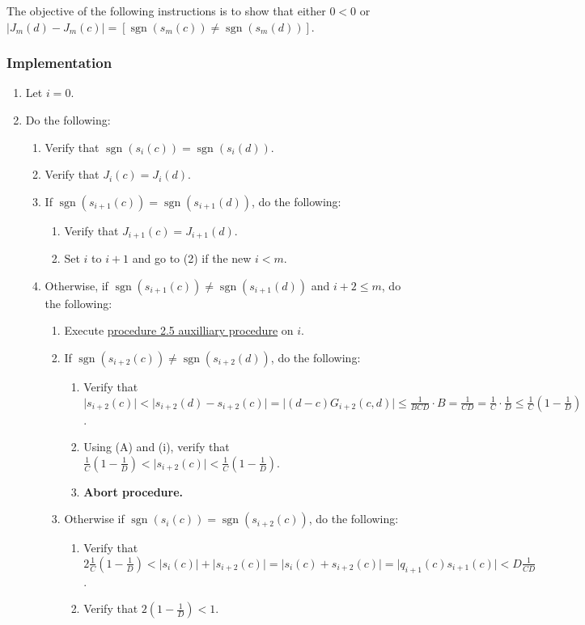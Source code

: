 \documentclass[twocolumn]{article}
\DeclareMathOperator{\sgn}{sgn}
\newcommand{\implementation}{\subsubsection*{Implementation}}
\begin{document}
				The objective of the following instructions is to show that either $0<0$ or $\lvert J_m(d)-J_m(c)\rvert=[\sgn(s_m(c))\ne\sgn(s_m(d))]$.
			\implementation
				\begin{enumerate}
					\item Let $i=0$.
					\item Do the following:
					\begin{enumerate}
						\item Verify that $\sgn(s_i(c))=\sgn(s_i(d))$.
						\item Verify that $J_i(c)=J_i(d)$.
						\item If $\sgn(s_{i+1}(c))=\sgn(s_{i+1}(d))$, do the following:
						\begin{enumerate}
							\item Verify that $J_{i+1}(c)=J_{i+1}(d)$.
							\item Set $i$ to $i+1$ and go to (2) if the new $i<m$.
						\end{enumerate}
						\item Otherwise, if $\sgn(s_{i+1}(c))\ne\sgn(s_{i+1}(d))$ and $i+2\le m$, do the following:
						\begin{enumerate}
							\item Execute \hyperref[sec:procedure 2.5 auxilliary procedure]{procedure 2.5 auxilliary procedure} on $i$.
							\item If $\sgn(s_{i+2}(c))\ne\sgn(s_{i+2}(d))$, do the following:
							\begin{enumerate}
								\item Verify that $\lvert s_{i+2}(c)\rvert<\lvert s_{i+2}(d)-s_{i+2}(c)\rvert=\lvert (d-c)G_{i+2}(c,d)\rvert\le\frac{1}{BCD}\cdot B=\frac{1}{CD}=\frac{1}{C}\cdot\frac{1}{D}\le\frac{1}{C}(1-\frac{1}{D})$.
								\item Using (A) and (i), verify that $\frac{1}{C}(1-\frac{1}{D})<\lvert s_{i+2}(c)\rvert<\frac{1}{C}(1-\frac{1}{D})$.
								\item \textbf{Abort procedure.}
							\end{enumerate}
							\item Otherwise if $\sgn(s_i(c))=\sgn(s_{i+2}(c))$, do the following:
							\begin{enumerate}
								\item Verify that $2\frac{1}{C}(1-\frac{1}{D})<\lvert s_i(c)\rvert+\lvert s_{i+2}(c)\rvert=\lvert s_i(c)+s_{i+2}(c)\rvert=\lvert q_{i+1}(c)s_{i+1}(c)\rvert<D\frac{1}{CD}$.
								\item Verify that $2(1-\frac{1}{D})<1$.

\end{enumerate}
\end{enumerate}
\end{enumerate}
\end{enumerate}
\end{document}
